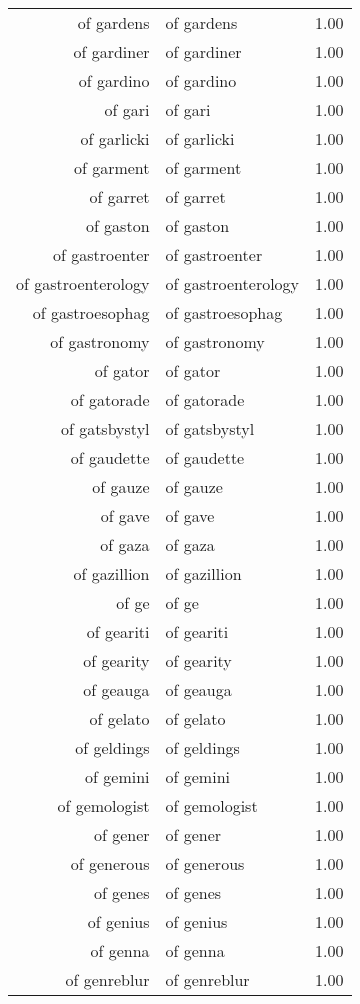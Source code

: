 \begin{table}[ht]
\begin{tabular}{rlr}
  of gardens & of gardens & 1.00 \\ 
  of gardiner & of gardiner & 1.00 \\ 
  of gardino & of gardino & 1.00 \\ 
  of gari & of gari & 1.00 \\ 
  of garlicki & of garlicki & 1.00 \\ 
  of garment & of garment & 1.00 \\ 
  of garret & of garret & 1.00 \\ 
  of gaston & of gaston & 1.00 \\ 
  of gastroenter & of gastroenter & 1.00 \\ 
  of gastroenterology & of gastroenterology & 1.00 \\ 
  of gastroesophag & of gastroesophag & 1.00 \\ 
  of gastronomy & of gastronomy & 1.00 \\ 
  of gator & of gator & 1.00 \\ 
  of gatorade & of gatorade & 1.00 \\ 
  of gatsbystyl & of gatsbystyl & 1.00 \\ 
  of gaudette & of gaudette & 1.00 \\ 
  of gauze & of gauze & 1.00 \\ 
  of gave & of gave & 1.00 \\ 
  of gaza & of gaza & 1.00 \\ 
  of gazillion & of gazillion & 1.00 \\ 
  of ge & of ge & 1.00 \\ 
  of geariti & of geariti & 1.00 \\ 
  of gearity & of gearity & 1.00 \\ 
  of geauga & of geauga & 1.00 \\ 
  of gelato & of gelato & 1.00 \\ 
  of geldings & of geldings & 1.00 \\ 
  of gemini & of gemini & 1.00 \\ 
  of gemologist & of gemologist & 1.00 \\ 
  of gener & of gener & 1.00 \\ 
  of generous & of generous & 1.00 \\ 
  of genes & of genes & 1.00 \\ 
  of genius & of genius & 1.00 \\ 
  of genna & of genna & 1.00 \\ 
  of genreblur & of genreblur & 1.00 \\ 

\end{tabular}
\end{table}
